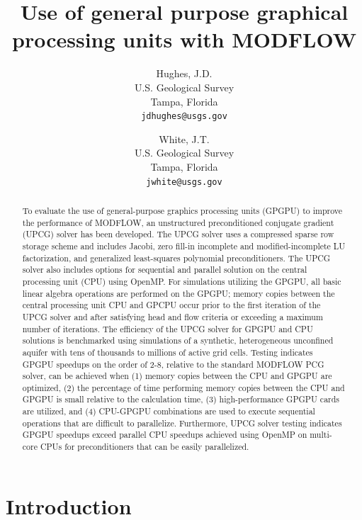 \documentclass[12pt]{article}
\title{Use of general purpose graphical processing units with MODFLOW}
\author{Hughes, J.D.\\U.S. Geological Survey\\ Tampa, Florida\\ \texttt{jdhughes@usgs.gov} \and White, J.T. \\ U.S. Geological Survey\\ Tampa, Florida\\ \texttt{jwhite@usgs.gov}}
\begin{document}
\maketitle
\begin{abstract}
To evaluate the use of general-purpose graphics processing units (GPGPU) to improve the performance of MODFLOW, an unstructured preconditioned conjugate gradient (UPCG) solver has been developed. The UPCG solver uses a compressed sparse row storage scheme and includes Jacobi, zero fill-in incomplete and modified-incomplete LU factorization, and generalized least-squares polynomial preconditioners. The UPCG solver also includes options for sequential and parallel solution on the central processing unit (CPU) using OpenMP. For simulations utilizing the GPGPU, all basic linear algebra operations are performed on the GPGPU; memory copies between the central processing unit CPU and GPCPU occur prior to the first iteration of the UPCG solver and after satisfying head and flow criteria or exceeding a maximum number of iterations. The efficiency of the UPCG solver for GPGPU and CPU solutions is benchmarked using simulations of a synthetic, heterogeneous  unconfined aquifer with tens of thousands to millions of active grid cells. Testing indicates GPGPU speedups on the order of 2-8, relative to the standard MODFLOW PCG solver, can be achieved when (1) memory copies between the CPU and GPGPU are optimized, (2) the percentage of time performing memory copies between the CPU and GPGPU is small relative to the calculation time, (3) high-performance GPGPU cards are utilized, and (4) CPU-GPGPU combinations are used to execute sequential operations that are difficult to parallelize. Furthermore, UPCG solver testing indicates GPGPU speedups exceed parallel CPU speedups achieved using OpenMP on multi-core CPUs for preconditioners that can be \color{blue}easily \color{black}parallelized.
\end{abstract}

\section*{Introduction}
\end{document}
